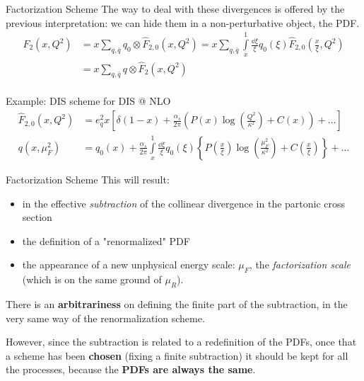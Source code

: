 \documentclass[8pt]{beamer}
\begin{document}
\begin{frame}{Factorization Scheme}
    \vspace*{15pt}
    The way to deal with these divergences is offered by the previous
    interpretation: we can hide them in a non-perturbative object, the PDF.
    \begin{align*}
        F_2(x,Q^2) &= x\sum_{q,\bar{q}} q_0 \otimes \hat{F}_{2,0} (x, Q^2) =
        x \sum_{q,\bar{q}} \int\limits_x^1 \frac{\dd\xi}{\xi} q_0(\xi)
        \hat{F}_{2,0}\left(\frac{x}{\xi},Q^2\right)\\
        &= x \sum_{q,\bar{q}} q \otimes \hat{F}_2 (x, Q^2)\\
    \end{align*}
    \vspace*{-15pt}

    Example: DIS scheme for DIS @ NLO
    \begin{align*}
        \hat{F}_{2,0}(x,Q^2) &= e_q^2 x \left[ \delta(1-x) +
        \frac{\alpha_s}{2\pi}\left(P(x) \log(\frac{Q^2}{\kappa^2}) +
        C(x)\right) + \dots \right]\\
        q(x, \mu^2_F) &= q_0(x) + \frac{\alpha_s}{2\pi} \int\limits_x^1
        \frac{\dd \xi}{\xi} q_0(\xi) \left\{ P\left(\frac{x}{\xi}\right)
        \log(\frac{\mu^2_F}{\kappa^2}) + C\left(\frac{x}{\xi}\right)\right\} +
        \dots
    \end{align*}
\end{frame}

\begin{frame}{Factorization Scheme}
    This will result:
    \begin{itemize}
        \item in the effective \textit{subtraction} of the collinear divergence
            in the partonic cross section
        \item the definition of a "renormalized" PDF
        \item the appearance of a new unphysical energy scale: $\mu_F$, the
            \textit{factorization scale} (which is on the same ground of $\mu_R$).
    \end{itemize}

    There is an \textbf{arbitrariness} on defining the finite part of the
    subtraction, in the very same way of the renormalization scheme.

    However, since the subtraction is related to a redefinition of the PDFs,
    once that a scheme has been \textbf{chosen} (fixing a finite subtraction)
    it should be kept for all the processes, because the \textbf{PDFs are
    always the same}.
\end{frame}
\end{document}
